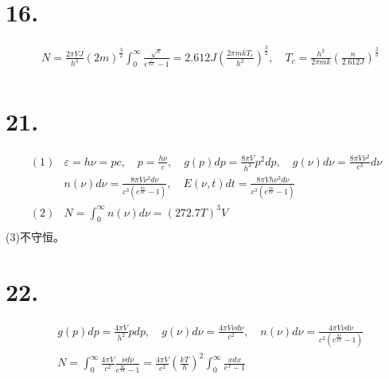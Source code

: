 \documentclass[UTF8]{ctexart}
\begin{document}
\section*{16.}
\begin{equation*}
  \begin{aligned}
     & N=\frac{2\pi VJ}{h^3}(2m)^\frac{3}{2}\int_0^\infty\frac{\sqrt\varepsilon}{e^{\frac
          {\varepsilon}{kT_c}}-1}=2.612J(\frac{2\pi mkT_c}{h^2})^\frac{3}{2},\quad T_c=\frac
    {h^2}{2\pi mk}(\frac{n}{2.612J})^\frac{2}{3}                                          \\
  \end{aligned}
\end{equation*}
\section*{21.}
\begin{equation*}
  \begin{aligned}
    (1) & \varepsilon=h\nu=pc,\quad p=\frac{h\nu}{c},\quad g(p)dp=\frac{8\pi V}{h^3}p^2d
    p,\quad g(\nu)d\nu=\frac{8\pi V\nu^2}{c^3}d\nu                                       \\
        & n(\nu)d\nu=\frac{8\pi V\nu^2d\nu}{c^3(e^\frac{h\nu}{kT}-1)},\quad E(\nu,t)dt=
    \frac{8\pi Vh\nu^3d\nu}{c^3(e^\frac{h\nu}{kT}-1)}                                    \\
    (2) & N=\int_0^\infty n(\nu)d\nu=(272.7T)^3V                                         \\
  \end{aligned}
\end{equation*}
(3)不守恒。
\section*{22.}
\begin{equation*}
  \begin{aligned}
     & g(p)dp=\frac{4\pi V}{h^2}pdp,\quad g(\nu)d\nu=\frac{4\pi V\nu d\nu}{c^2},\quad
    n(\nu)d\nu=\frac{4\pi V\nu d\nu}{c^2(e^\frac{h\nu}{kT}-1)}                        \\
     & N=\int_0^\infty\frac{4\pi V}{c^2}\frac{\nu d\nu}{e^\frac{h\nu}{kT}-1}=\frac
    {4\pi V}{c^2}(\frac{kT}{h})^2\int_0^\infty\frac{xdx}{e^x-1}                       \\
  \end{aligned}
\end{equation*}
\end{document}
